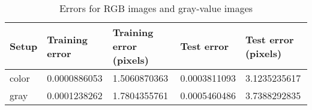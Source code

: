 \begin{table}[h!]
\centering
\footnotesize
\begin{tabular}{|l|l|l|l|l|}
	\hline
		\textbf{Setup} & \textbf{Training error} & \textbf{Training error (pixels)} & \textbf{Test error} & \textbf{Test error (pixels)}\\
	\hline
		color 	& 0.0000886053%
				& 1.5060870363%
				& 0.0003811093%
				& 3.1235235617%
				\\
	\hline
		gray	& 0.0001238262%
				& 1.7804355761%
				& 0.0005460486%
				& 3.7388292835%
				\\
	\hline
	\end{tabular}
	\normalsize
	\caption{Errors for RGB images and gray-value images}
	\label{tab:gabor_errors_color_vs_gray}
\end{table}
